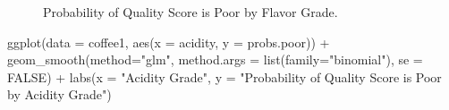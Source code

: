 \documentclass[
  letterpaper,
  DIV=11,
  numbers=noendperiod]{scrartcl}
\newenvironment{Shaded}{\begin{snugshade}}{\end{snugshade}}
\newcommand{\AttributeTok}[1]{\textcolor[rgb]{0.40,0.45,0.13}{#1}}
\newcommand{\ConstantTok}[1]{\textcolor[rgb]{0.56,0.35,0.01}{#1}}
\newcommand{\FunctionTok}[1]{\textcolor[rgb]{0.28,0.35,0.67}{#1}}
\newcommand{\NormalTok}[1]{\textcolor[rgb]{0.00,0.23,0.31}{#1}}
\newcommand{\SpecialCharTok}[1]{\textcolor[rgb]{0.37,0.37,0.37}{#1}}
\newcommand{\StringTok}[1]{\textcolor[rgb]{0.13,0.47,0.30}{#1}}
\begin{document}
\begin{figure}[H]


\caption{\label{fig-prob2}Probability of Quality Score is Poor by Flavor
Grade.}

\end{figure}%

\begin{Shaded}
\begin{Highlighting}[]
\FunctionTok{ggplot}\NormalTok{(}\AttributeTok{data =}\NormalTok{ coffee1, }\FunctionTok{aes}\NormalTok{(}\AttributeTok{x =}\NormalTok{ acidity, }\AttributeTok{y =}\NormalTok{ probs.poor)) }\SpecialCharTok{+}
  \FunctionTok{geom\_smooth}\NormalTok{(}\AttributeTok{method=}\StringTok{"glm"}\NormalTok{, }
              \AttributeTok{method.args =} \FunctionTok{list}\NormalTok{(}\AttributeTok{family=}\StringTok{"binomial"}\NormalTok{), }
              \AttributeTok{se =} \ConstantTok{FALSE}\NormalTok{) }\SpecialCharTok{+}
  \FunctionTok{labs}\NormalTok{(}\AttributeTok{x =} \StringTok{"Acidity Grade"}\NormalTok{, }
       \AttributeTok{y =} \StringTok{"Probability of Quality Score is Poor by Acidity Grade"}\NormalTok{)}
\end{Highlighting}
\end{Shaded}
\end{document}
